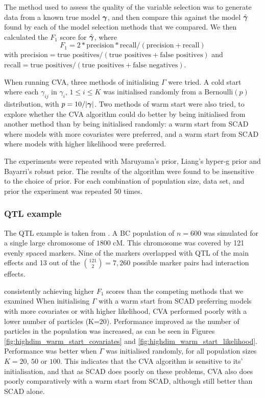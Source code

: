 
The method used to assess the quality of the variable selection was to generate data from a known true model
${\boldsymbol \gamma}$,
and then compare this against the model $\hat{{\boldsymbol \gamma}}$ found by each of the model selection methods that we 
compared.
We then calculated the $F_1$ score for $\hat{{\boldsymbol \gamma}}$,
where
$$F_1 = 2 * \text{precision} * \text{recall} / (\text{precision} + \text{recall})$$ with
$\text{precision} = \text{true positives} / (\text{true positives} + \text{false positives})$ and
$\text{recall} = \text{true positives} / (\text{true positives} + \text{false negatives})$.

When running CVA,
three methods of initialising $\Gamma$ were tried.
A cold start where each $\gamma_{ij}$ in $\gamma_i$, $1 \leq i \leq K$ was initialised randomly from a
$\text{Bernoulli}(p)$ distribution, with $p = 10 / |{\boldsymbol \gamma}|$.
Two methods of warm start were also tried, to explore whether the CVA algorithm could do better by being
initialised from another method than by being initialised randomly: 
a warm start from SCAD where models with more covariates were preferred, and
a warm start from SCAD where models with higher likelihood were preferred.

The experiments were repeated with Maruyama's prior, Liang's hyper-g prior and Bayarri's robust prior.
The results of the algorithm were found to be insensitive to the choice of prior.
For each combination of population size, data set, and prior the experiment was repeated 50 times.

\subsubsection{QTL example}
The QTL example is taken from \cite{Xu2007}. A BC population of $n=600$ was simulated for a single large
chromosome of $1800$ cM. This chromosome was covered by 121 evenly spaced markers. Nine of the markers
overlapped with QTL of the main effects and 13 out of the $\binom{121} 2 = 7,260$ possible marker pairs had
interaction effects.

consistently achieving higher $F_1$ scores than the competing methods that we examined
When initialising $\Gamma$ with a warm start from SCAD preferring models with more covariates or with higher
likelihood, CVA performed poorly with a lower number of particles (K=$20$). Performance improved as the number
of particles in the population was increased, as can be seen in Figures
\ref{fig:highdim_warm_start_covariates} and \ref{fig:highdim_warm_start_likelihood}. Performance was better
when $\Gamma$ was initialised randomly, for all population sizes $K=20$, $50$ or $100$. This indicates that
the CVA algorithm is sensitive to its' initialisation, and that as SCAD does poorly on these problems, CVA
also does poorly comparatively with a warm start from SCAD, although still better than SCAD alone.

